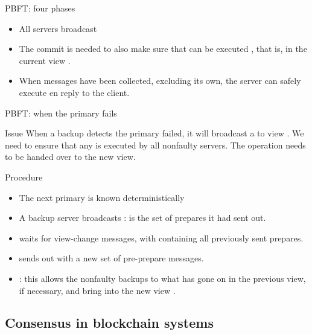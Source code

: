 \begin{slide}{PBFT: four phases}
  \begin{centerfig}
  \end{centerfig}
  \begin{itemize}\tightlist
  \item All servers broadcast 
  \item The commit is needed to also make sure that  can be executed , that is, in the current
    view .
  \item When  messages have been collected, excluding its own, the server can safely execute  en
    reply to the client.
  \end{itemize}
\end{slide}
\begin{slide}{PBFT: when the primary fails}
  \begin{block}{Issue}
    When a backup detects the primary failed, it will broadcast a  to view . We
    need to ensure that any  is executed  by all nonfaulty
    servers. The operation needs to be handed over to the new view.
  \end{block}

  \begin{block}{Procedure}
    \begin{itemize}
    \item The next primary  is known deterministically
    \item A backup server broadcasts :  is the set of
      prepares it had sent out.
    \item {} waits for  view-change messages, with 
      containing all previously sent prepares.
    \item {} sends out  with  a new set of pre-prepare
      messages.
    \item {}: this allows the nonfaulty backups to  what has gone on in the previous
      view, if necessary, and bring  into the new view .
    \end{itemize}
  \end{block}
\end{slide}
\subsection{Consensus in blockchain systems}
